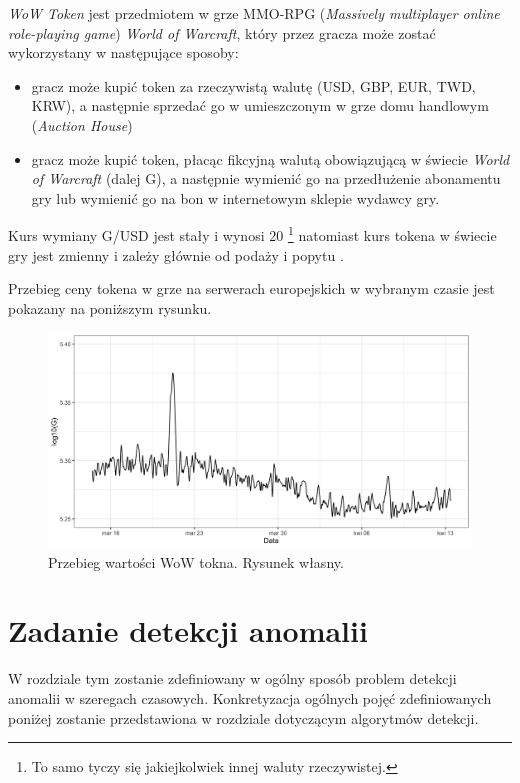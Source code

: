 \documentclass{article}
\begin{document}
\emph{WoW Token} jest przedmiotem w grze MMO-RPG (\emph{Massively
multiplayer online role-playing game}) \emph{World of Warcraft}, który
przez gracza może zostać wykorzystany w następujące sposoby:

\begin{itemize}
\item
  gracz może kupić token za rzeczywistą walutę (USD, GBP, EUR, TWD,
  KRW), a następnie sprzedać go w umieszczonym w grze domu handlowym
  (\emph{Auction House})
\item
  gracz może kupić token, płacąc fikcyjną walutą obowiązującą w świecie
  \emph{World of Warcraft} (dalej G), a następnie wymienić go na
  przedłużenie abonamentu gry lub wymienić go na bon w internetowym
  sklepie wydawcy gry.
\end{itemize}

Kurs wymiany G/USD jest stały i wynosi $20$ \footnote{To samo tyczy
  się jakiejkolwiek innej waluty rzeczywistej.} natomiast kurs tokena w
świecie gry jest zmienny i zależy głównie od podaży i popytu
\cite{wtoken-info}.

Przebieg ceny tokena w grze na serwerach europejskich w wybranym czasie
jest pokazany na poniższym rysunku.

\begin{figure}
  \centering
  \includegraphics[width=\textwidth]{./images/wtoken-random.png}
  \caption{Przebieg wartości WoW tokna. Rysunek własny.}
\end{figure}

\section{Zadanie detekcji anomalii \label{r3}}

W rozdziale tym zostanie zdefiniowany w ogólny sposób problem detekcji
anomalii w szeregach czasowych. Konkretyzacja ogólnych pojęć
zdefiniowanych poniżej zostanie przedstawiona w rozdziale dotyczącym
algorytmów detekcji.
\end{document}
